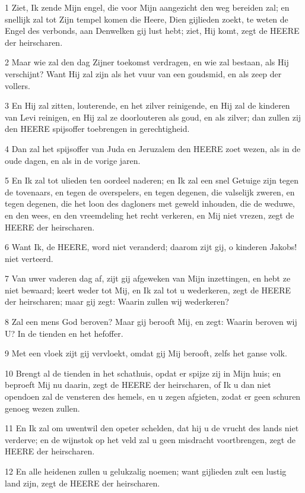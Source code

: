 \par 1 Ziet, Ik zende Mijn engel, die voor Mijn aangezicht den weg bereiden zal; en snellijk zal tot Zijn tempel komen die Heere, Dien gijlieden zoekt, te weten de Engel des verbonds, aan Denwelken gij lust hebt; ziet, Hij komt, zegt de HEERE der heirscharen.
\par 2 Maar wie zal den dag Zijner toekomst verdragen, en wie zal bestaan, als Hij verschijnt? Want Hij zal zijn als het vuur van een goudsmid, en als zeep der vollers.
\par 3 En Hij zal zitten, louterende, en het zilver reinigende, en Hij zal de kinderen van Levi reinigen, en Hij zal ze doorlouteren als goud, en als zilver; dan zullen zij den HEERE spijsoffer toebrengen in gerechtigheid.
\par 4 Dan zal het spijsoffer van Juda en Jeruzalem den HEERE zoet wezen, als in de oude dagen, en als in de vorige jaren.
\par 5 En Ik zal tot ulieden ten oordeel naderen; en Ik zal een snel Getuige zijn tegen de tovenaars, en tegen de overspelers, en tegen degenen, die valselijk zweren, en tegen degenen, die het loon des dagloners met geweld inhouden, die de weduwe, en den wees, en den vreemdeling het recht verkeren, en Mij niet vrezen, zegt de HEERE der heirscharen.
\par 6 Want Ik, de HEERE, word niet veranderd; daarom zijt gij, o kinderen Jakobs! niet verteerd.
\par 7 Van uwer vaderen dag af, zijt gij afgeweken van Mijn inzettingen, en hebt ze niet bewaard; keert weder tot Mij, en Ik zal tot u wederkeren, zegt de HEERE der heirscharen; maar gij zegt: Waarin zullen wij wederkeren?
\par 8 Zal een mens God beroven? Maar gij berooft Mij, en zegt: Waarin beroven wij U? In de tienden en het hefoffer.
\par 9 Met een vloek zijt gij vervloekt, omdat gij Mij berooft, zelfs het ganse volk.
\par 10 Brengt al de tienden in het schathuis, opdat er spijze zij in Mijn huis; en beproeft Mij nu daarin, zegt de HEERE der heirscharen, of Ik u dan niet opendoen zal de vensteren des hemels, en u zegen afgieten, zodat er geen schuren genoeg wezen zullen.
\par 11 En Ik zal om uwentwil den opeter schelden, dat hij u de vrucht des lands niet verderve; en de wijnstok op het veld zal u geen misdracht voortbrengen, zegt de HEERE der heirscharen.
\par 12 En alle heidenen zullen u gelukzalig noemen; want gijlieden zult een lustig land zijn, zegt de HEERE der heirscharen.

